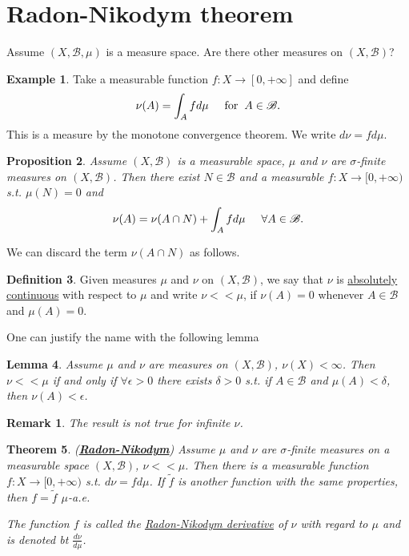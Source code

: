 \documentclass{article}
\newtheorem{theorem}{Theorem}[section]
\newtheorem{lemma}[theorem]{Lemma}
\newtheorem{proposition}[theorem]{Proposition}
\newtheorem*{remark}{Remark}
\theoremstyle{definition}
\newtheorem{definition}[theorem]{Definition}
\newtheorem{example}[theorem]{Example}
\newcommand{\tmm}{\hspace{2mm}}
\newcommand{\B}{\mathscr{B}}
\begin{document}
\section{Radon-Nikodym theorem}
Assume $(X,\B,\mu)$ is a measure space. Are there other measures on $(X,\B)$?
\begin{example}
    Take a measurable function $f:X\rightarrow [0,+\infty]$ and define $$\nu(A)=\int_A fd\mu \hspace{5mm}\text{for}\tmm A\in \B.$$
    This is a measure by the monotone convergence theorem. We write $d\nu = fd\mu$.
\end{example}
\begin{proposition}
    Assume $(X,\B)$ is a measurable space, $\mu$ and $\nu$ are $\sigma$-finite measures on $(X,\B)$. Then there exist $ N\in \B$ and a measurable
    $f:X\rightarrow [0,+\infty)$ s.t. $\mu(N)=0$ and 
    $$\nu(A) = \nu(A\cap N)+\int_A fd\mu \hspace{5mm} \forall A\in\B.$$

\end{proposition}
We can discard the term $\nu(A\cap N)$ as follows.

\begin{definition}
    Given measures $\mu$ and $\nu$ on $(X,\B)$, we say that $\nu$ is \underline{absolutely continuous} with respect to $\mu$ and write $\nu<<\mu$, if $\nu(A)=0$ whenever $A\in\B$ and $\mu(A)=0$.
\end{definition}
One can justify the name with the following lemma
\begin{lemma}
    Assume $\mu$ and $\nu$ are measures on $(X,\B)$, $\nu(X)<\infty$. Then $\nu<<\mu$ if and only if $\forall \epsilon>0$ there exists $\delta>0 $ s.t. if $A\in\B$
    and $\mu(A)<\delta$, then $\nu(A)<\epsilon$.
\end{lemma}
\begin{remark}
    The result is not true for infinite $\nu$.
\end{remark}
\begin{theorem}(\underline{\textbf{Radon-Nikodym}})
    Assume $\mu$ and $\nu$ are $\sigma$-finite measures on a measurable space $(X,\B)$, $\nu<<\mu$. Then there is a measurable function $f:X\rightarrow[0,+\infty)$ s.t. $d\nu = fd\mu$.
    If $\tilde f$ is another function with the same properties, then $f=\tilde f$  $\mu$-a.e.

    The function $f$ is called the \underline{Radon-Nikodym derivative} of $\nu$ with regard to $\mu$ and is denoted bt $\frac{d\nu}{d\mu}$.
\end{theorem}
\end{document}
